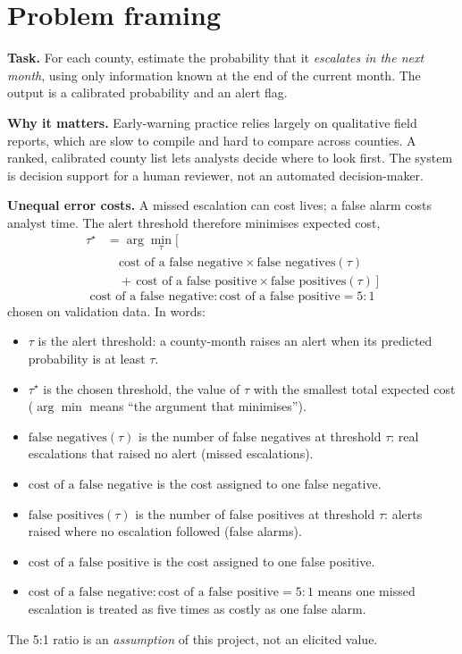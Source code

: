 \documentclass[11pt,a4paper]{article}
\begin{document}
\section{Problem framing}
\textbf{Task.} For each county, estimate the probability that it \emph{escalates in the next month}, using only
information known at the end of the current month. The output is a calibrated probability and an alert flag.

\textbf{Why it matters.} Early-warning practice relies largely on qualitative field reports, which are slow to compile and
hard to compare across counties. A ranked, calibrated county list lets analysts decide where to look first. The system is
decision support for a human reviewer, not an automated decision-maker.

\textbf{Unequal error costs.} A missed escalation can cost lives; a false alarm costs analyst time. The alert threshold
therefore minimises expected cost,
{\small\begin{align}
  \tau^\star&=\arg\min_{\tau}\Big[\,\nonumber\\
  &\quad\text{cost of a false negative}\times\text{false negatives}(\tau)\nonumber\\
  &\quad+\,\text{cost of a false positive}\times\text{false positives}(\tau)\,\Big]\nonumber
\end{align}}
\begin{equation}
  \text{cost of a false negative}:\text{cost of a false positive}=5:1
\end{equation}
chosen on validation data. In words:
\begin{itemize}\setlength{\itemsep}{2pt}
  \item $\tau$ is the alert threshold: a county-month raises an alert when its predicted probability is at least $\tau$.
  \item $\tau^\star$ is the chosen threshold, the value of $\tau$ with the smallest total expected cost ($\arg\min$ means ``the argument that minimises'').
  \item $\text{false negatives}(\tau)$ is the number of false negatives at threshold $\tau$: real escalations that raised no alert (missed escalations).
  \item $\text{cost of a false negative}$ is the cost assigned to one false negative.
  \item $\text{false positives}(\tau)$ is the number of false positives at threshold $\tau$: alerts raised where no escalation followed (false alarms).
  \item $\text{cost of a false positive}$ is the cost assigned to one false positive.
  \item $\text{cost of a false negative}:\text{cost of a false positive}=5:1$ means one missed escalation is treated as five times as costly as one false alarm.
\end{itemize}
The 5:1 ratio is an \emph{assumption} of this project, not an elicited value.
\end{document}
